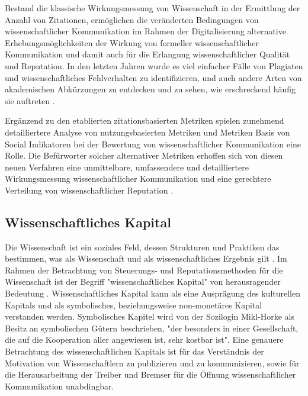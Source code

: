 Bestand die klassische Wirkungsmessung von Wissenschaft in der Ermittlung der Anzahl von Zitationen, ermöglichen die veränderten Bedingungen von wissenschaftlicher Kommunikation im Rahmen der Digitalisierung alternative Erhebungsmöglichkeiten der Wirkung von formeller wissenschaftlicher Kommunikation und damit auch für die Erlangung wissenschaftlicher Qualität und Reputation. In den letzten Jahren wurde es viel einfacher Fälle von Plagiaten und wissenschaftliches Fehlverhalten zu identifizieren, und auch andere Arten von akademischen Abkürzungen zu entdecken und zu sehen, wie erschreckend häufig sie auftreten \cite{rekdal_2014_academic}.

Ergänzend zu den etablierten zitationsbasierten Metriken spielen zunehmend detailliertere Analyse von nutzungsbasierten Metriken und Metriken Basis von Social Indikatoren \cite{peters_2015_research} bei der Bewertung von wissenschaftlicher Kommunikation eine Rolle. Die Befürworter solcher alternativer Metriken erhoffen sich von diesen neuen Verfahren eine unmittelbare, umfassendere und detailliertere Wirkungsmessung wissenschaftlicher Kommunikation und eine gerechtere Verteilung von wissenschaftlicher Reputation \cite{peters_2015_research} \cite{cite:17} \cite{dora_2013}.

\subsection{Wissenschaftliches Kapital}

Die Wissenschaft ist ein soziales Feld, dessen Strukturen und Praktiken das bestimmen, was als Wissenschaft und als wissenschaftliches Ergebnis gilt \cite{mikl_2010_soziologie}. Im Rahmen der Betrachtung von Steuerungs- und Reputationsmethoden für die Wissenschaft ist der Begriff "wissenschaftliches Kapital" von herausragender Bedeutung \cite{Barl_sius_2008}. Wissenschaftliches Kapital kann als eine Ausprägung des kulturellen Kapitals und als symbolisches, beziehungsweise non-monetäres Kapital \cite{irmer2011} \cite{hagner_2015_sache_buches} verstanden werden.
Symbolisches Kapitel wird von der Sozilogin Mikl-Horke als Besitz an symbolischen Gütern beschrieben, "der besonders in einer Gesellschaft, die auf die Kooperation aller angewiesen ist, sehr kostbar ist"\cite{mikl_2010_soziologie}. Eine genauere Betrachtung des wissenschaftlichen Kapitals ist für das Verständnis der Motivation von Wissenschaftlern zu publizieren und zu kommunizieren, sowie für die Herausarbeitung der Treiber und Bremser für die Öffnung wissenschaftlicher Kommunikation unabdingbar.

